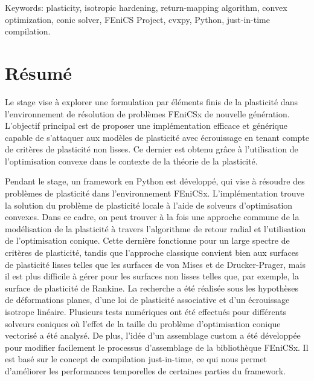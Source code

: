 \documentclass[12pt]{article}
\begin{document}
Keywords: plasticity, isotropic hardening, return-mapping algorithm, convex optimization, conic solver, FEniCS Project, cvxpy, Python, just-in-time compilation.

\newpage
\section*{\centering Résumé}

Le stage vise à explorer une formulation par éléments finis de la plasticité dans l'environnement de résolution de problèmes FEniCSx de nouvelle génération. L'objectif principal est de proposer une implémentation efficace et générique capable de s'attaquer aux modèles de plasticité avec écrouissage en tenant compte de critères de plasticité non lisses. Ce dernier est obtenu grâce à l'utilisation de l'optimisation convexe dans le contexte de la théorie de la plasticité.

Pendant le stage, un framework en Python est développé, qui vise à résoudre des problèmes de plasticité dans l'environnement FEniCSx. L'implémentation trouve la solution du problème de plasticité locale à l'aide de solveurs d'optimisation convexes. Dans ce cadre, on peut trouver à la fois une approche commune de la modélisation de la plasticité à travers l'algorithme de retour radial et l'utilisation de l'optimisation conique. Cette dernière fonctionne pour un large spectre de critères de plasticité, tandis que l'approche classique convient bien aux surfaces de plasticité lisses telles que les surfaces de von Mises et de Drucker-Prager, mais il est plus difficile à gérer pour les surfaces non lisses telles que, par exemple, la surface de plasticité de Rankine. La recherche a été réalisée sous les hypothèses de déformations planes, d'une loi de plasticité associative et d'un écrouissage isotrope linéaire. Plusieurs tests numériques ont été effectués pour différents solveurs coniques où l'effet de la taille du problème d'optimisation conique vectorisé a été analysé. De plus, l'idée d'un assemblage custom a été développée pour modifier facilement le processus d'assemblage de la bibliothèque FEniCSx. Il est basé sur le concept de compilation just-in-time, ce qui nous permet d'améliorer les performances temporelles de certaines parties du framework.
\end{document}
